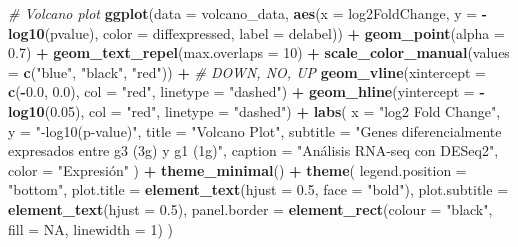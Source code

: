 \documentclass[
]{article}
\newenvironment{Shaded}{\begin{snugshade}}{\end{snugshade}}
\newcommand{\AttributeTok}[1]{\textcolor[rgb]{0.13,0.29,0.53}{#1}}
\newcommand{\CommentTok}[1]{\textcolor[rgb]{0.56,0.35,0.01}{\textit{#1}}}
\newcommand{\ConstantTok}[1]{\textcolor[rgb]{0.56,0.35,0.01}{#1}}
\newcommand{\DecValTok}[1]{\textcolor[rgb]{0.00,0.00,0.81}{#1}}
\newcommand{\FloatTok}[1]{\textcolor[rgb]{0.00,0.00,0.81}{#1}}
\newcommand{\FunctionTok}[1]{\textcolor[rgb]{0.13,0.29,0.53}{\textbf{#1}}}
\newcommand{\NormalTok}[1]{#1}
\newcommand{\SpecialCharTok}[1]{\textcolor[rgb]{0.81,0.36,0.00}{\textbf{#1}}}
\newcommand{\StringTok}[1]{\textcolor[rgb]{0.31,0.60,0.02}{#1}}
\begin{document}
\begin{Shaded}
\begin{Highlighting}[]
\CommentTok{\# Volcano plot}
\FunctionTok{ggplot}\NormalTok{(}\AttributeTok{data =}\NormalTok{ volcano\_data,}
       \FunctionTok{aes}\NormalTok{(}\AttributeTok{x =}\NormalTok{ log2FoldChange,}
           \AttributeTok{y =} \SpecialCharTok{{-}}\FunctionTok{log10}\NormalTok{(pvalue),}
           \AttributeTok{color =}\NormalTok{ diffexpressed,}
           \AttributeTok{label =}\NormalTok{ delabel)) }\SpecialCharTok{+}
  \FunctionTok{geom\_point}\NormalTok{(}\AttributeTok{alpha =} \FloatTok{0.7}\NormalTok{) }\SpecialCharTok{+}
  \FunctionTok{geom\_text\_repel}\NormalTok{(}\AttributeTok{max.overlaps =} \DecValTok{10}\NormalTok{) }\SpecialCharTok{+}
  \FunctionTok{scale\_color\_manual}\NormalTok{(}\AttributeTok{values =} \FunctionTok{c}\NormalTok{(}\StringTok{"blue"}\NormalTok{, }\StringTok{"black"}\NormalTok{, }\StringTok{"red"}\NormalTok{)) }\SpecialCharTok{+}  \CommentTok{\# DOWN, NO, UP}
  \FunctionTok{geom\_vline}\NormalTok{(}\AttributeTok{xintercept =} \FunctionTok{c}\NormalTok{(}\SpecialCharTok{{-}}\FloatTok{0.0}\NormalTok{, }\FloatTok{0.0}\NormalTok{), }\AttributeTok{col =} \StringTok{"red"}\NormalTok{, }\AttributeTok{linetype =} \StringTok{"dashed"}\NormalTok{) }\SpecialCharTok{+}
  \FunctionTok{geom\_hline}\NormalTok{(}\AttributeTok{yintercept =} \SpecialCharTok{{-}}\FunctionTok{log10}\NormalTok{(}\FloatTok{0.05}\NormalTok{), }\AttributeTok{col =} \StringTok{"red"}\NormalTok{, }\AttributeTok{linetype =} \StringTok{"dashed"}\NormalTok{) }\SpecialCharTok{+}
  \FunctionTok{labs}\NormalTok{(}
    \AttributeTok{x =} \StringTok{"log2 Fold Change"}\NormalTok{,}
    \AttributeTok{y =} \StringTok{"{-}log10(p{-}value)"}\NormalTok{,}
    \AttributeTok{title =} \StringTok{"Volcano Plot"}\NormalTok{,}
    \AttributeTok{subtitle =} \StringTok{"Genes diferencialmente expresados entre g3 (3g) y g1 (1g)"}\NormalTok{,}
    \AttributeTok{caption =} \StringTok{"Análisis RNA{-}seq con DESeq2"}\NormalTok{,}
    \AttributeTok{color =} \StringTok{"Expresión"}
\NormalTok{  ) }\SpecialCharTok{+}
  \FunctionTok{theme\_minimal}\NormalTok{() }\SpecialCharTok{+}
  \FunctionTok{theme}\NormalTok{(}
    \AttributeTok{legend.position =} \StringTok{"bottom"}\NormalTok{,}
    \AttributeTok{plot.title =} \FunctionTok{element\_text}\NormalTok{(}\AttributeTok{hjust =} \FloatTok{0.5}\NormalTok{, }\AttributeTok{face =} \StringTok{"bold"}\NormalTok{),}
    \AttributeTok{plot.subtitle =} \FunctionTok{element\_text}\NormalTok{(}\AttributeTok{hjust =} \FloatTok{0.5}\NormalTok{),}
    \AttributeTok{panel.border =} \FunctionTok{element\_rect}\NormalTok{(}\AttributeTok{colour =} \StringTok{"black"}\NormalTok{, }\AttributeTok{fill =} \ConstantTok{NA}\NormalTok{, }\AttributeTok{linewidth =} \DecValTok{1}\NormalTok{)}
\NormalTok{  )}
\end{Highlighting}
\end{Shaded}
\end{document}
